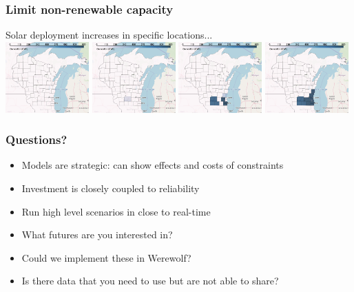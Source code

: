 \documentclass[xcolor=dvipsnames]{beamer}
\begin{document}
\begin{frame}
  \frametitle{Limit non-renewable capacity}
  Solar deployment increases in specific locations... \\
  \includegraphics[width=0.24\textwidth]{includes/no_leakage_maxNR_solar_r0.png}
  \includegraphics[width=0.24\textwidth]{includes/no_leakage_maxNR_solar_r2.png}
  \includegraphics[width=0.24\textwidth]{includes/no_leakage_maxNR_solar_r3.png}
  \includegraphics[width=0.24\textwidth]{includes/no_leakage_maxNR_solar_r4.png}

\end{frame}

\begin{frame}
  \frametitle{Questions?}
  \begin{itemize}
  \item Models are strategic: can show effects and costs of constraints
  \item Investment is closely coupled to reliability
  \item Run high level scenarios in close to real-time
  \item \alert{What futures are you interested in?}
    \color{blue}
  \item Could we implement these
    in Werewolf?
  \item Is there data that you need to use but are not able to share?
  \end{itemize}
\end{frame}
%
\appendix
\end{document}
